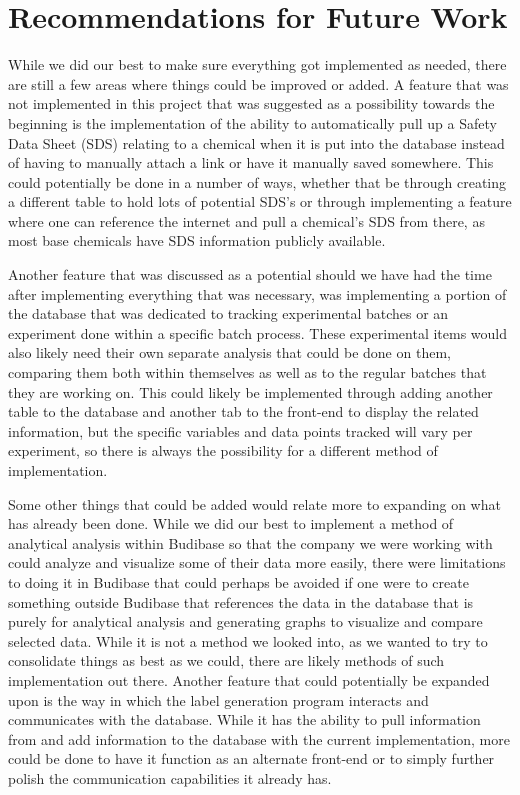 \documentclass{article}
\begin{document}
\section{Recommendations for Future Work}
While we did our best to make sure everything got implemented as needed, there are still a few areas where things could be improved 
or added. A feature that was not implemented in this project that was suggested as a possibility towards the beginning is the 
implementation of the ability to automatically pull up a Safety Data Sheet (SDS) relating to a chemical when it is put into the 
database instead of having to manually attach a link or have it manually saved somewhere. This could potentially be done in a number 
of ways, whether that be through creating a different table to hold lots of potential SDS’s or through implementing a feature where 
one can reference the internet and pull a chemical’s SDS from there, as most base chemicals have SDS information publicly available.  

Another feature that was discussed as a potential should we have had the time after implementing everything that was necessary, was 
implementing a portion of the database that was dedicated to tracking experimental batches or an experiment done within a specific 
batch process. These experimental items would also likely need their own separate analysis that could be done on them, comparing 
them both within themselves as well as to the regular batches that they are working on. This could likely be implemented through 
adding another table to the database and another tab to the front-end to display the related information, but the specific variables 
and data points tracked will vary per experiment, so there is always the possibility for a different method of implementation. 

Some other things that could be added would relate more to expanding on what has already been done. While we did our best to 
implement a method of analytical analysis within Budibase so that the company we were working with could analyze and visualize some 
of their data more easily, there were limitations to doing it in Budibase that could perhaps be avoided if one were to create 
something outside Budibase that references the data in the database that is purely for analytical analysis and generating 
graphs to visualize and compare selected data. While it is not a method we looked into, as we wanted to try to consolidate things 
as best as we could, there are likely methods of such implementation out there. Another feature that could potentially be expanded 
upon is the way in which the label generation program interacts and communicates with the database. While it has the ability to pull 
information from and add information to the database with the current implementation, more could be done to have it function as an 
alternate front-end or to simply further polish the communication capabilities it already has. 
\end{document}
